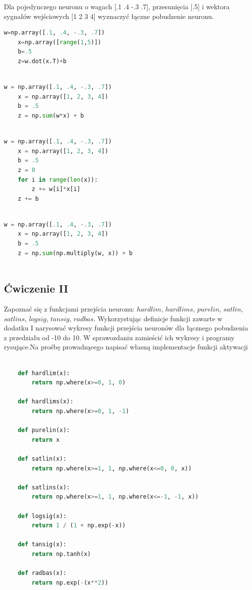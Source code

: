 \documentclass[12pt,twoside]{article}
\begin{document}
Dla pojedynczego neuronu o wagach [.1 .4 -.3 .7], przesunięcia [.5] i wektora sygnałów wejściowych [1 2
3 4] wyznaczyć łączne pobudzenie neuronu.

\begin{lstlisting}[language=Python,caption=Pierwotny sposób,label={KodPerl1}]
	w=np.array([.1, .4, -.3, .7])
	x=np.array([range(1,5)])
	b=.5
	z=w.dot(x.T)+b
	
\end{lstlisting}

\begin{lstlisting}[language=Python,caption=I sposób ,label={KodPerl1}]
	w = np.array([.1, .4, -.3, .7])
	x = np.array([1, 2, 3, 4])
	b = .5
	z = np.sum(w*x) + b
	
\end{lstlisting}
\begin{lstlisting}[language=Python,caption=II sposóbl,label={KodPerl1}]
	w = np.array([.1, .4, -.3, .7])
	x = np.array([1, 2, 3, 4])
	b = .5
	z = 0
	for i in range(len(x)):
		z += w[i]*x[i]
	z += b
	
\end{lstlisting}
\begin{lstlisting}[language=Python,caption=III sposób,label={KodPerl1}]
	w = np.array([.1, .4, -.3, .7])
	x = np.array([1, 2, 3, 4])
	b = .5
	z = np.sum(np.multiply(w, x)) + b
	
\end{lstlisting}

\subsection{Ćwiczenie II}
Zapoznać się z funkcjami przejścia neuronu: $hardlim$, $hardlims$, $purelin$, $satlin$,
$satlins$, $logsig$, $tansig$, $radbas$. Wykorzystując definicje funkcji zawarte w dodatku I
narysować wykresy funkcji przejścia neuronów dla łącznego pobudzenia z przedziału od -10 do 10.
W sprawozdaniu zamieścić ich wykresy i programy rysujące.Na prośbę prowadzącego napisać własną implementacje funkcji aktywacji


\begin{lstlisting}[language=Python,caption= Implementacja funkcji aktywacji , label={KodPerl1}]

	def hardlim(x):
	    return np.where(x>=0, 1, 0)

	def hardlims(x):
	    return np.where(x>=0, 1, -1)

	def purelin(x):
	    return x

	def satlin(x):
	    return np.where(x>=1, 1, np.where(x<=0, 0, x))

	def satlins(x):
	    return np.where(x>=1, 1, np.where(x<=-1, -1, x))

	def logsig(x):
	    return 1 / (1 + np.exp(-x))

	def tansig(x):
	    return np.tanh(x)

	def radbas(x):
	    return np.exp(-(x**2))

\end{lstlisting}
\end{document}
